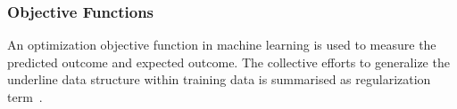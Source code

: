 \subsubsection{Objective Functions}
An optimization objective function in machine learning is used to measure  the predicted outcome and expected outcome. The collective efforts to generalize the underline data structure within training data is summarised as regularization term~\cite{goodfellow_2015}.  